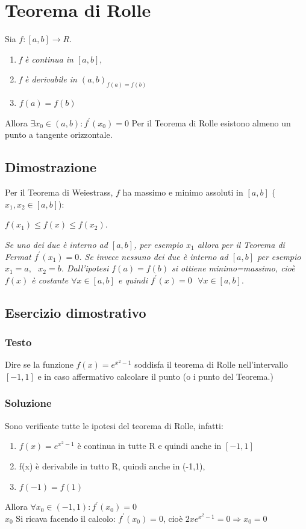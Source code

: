 \section{Teorema di Rolle}
Sia $f:[a,b]\to R$.
\begin{enumerate}
	\item \textit{f è continua in $[a,b]$},
	\item \textit{f è derivabile in $(a,b)_{f(a)=f(b)}$}
	\item $f(a)=f(b)$
\end{enumerate}
Allora $\exists x_0 \in (a,b):f^\prime(x_0)=0$ Per il Teorema di Rolle esistono
almeno un punto a tangente orizzontale.
\subsection{Dimostrazione}
Per il Teorema di Weiestrass, $f$ ha massimo e minimo assoluti in $[a,b]$
($x_1,x_2\in[a,b]$):
\begin{center}
	$f(x_1)\leq f(x)\leq f(x_2).$
\end{center}
\textit{Se uno dei due è interno ad $[a,b]$, per esempio $x_1$ allora per il
Teorema di Fermat $f^\prime(x_1)=0$. Se invece nessuno dei due è interno ad
$[a,b]$ per esempio $x_1=a, \text{ } x_2=b$. Dall'ipotesi $f(a)=f(b)$ si ottiene
minimo=massimo, cioè $f(x)$ è costante $\forall x \in[a,b]$ e quindi
$f^\prime(x)=0\text{ } \forall x \in [a,b]$}.
\subsection{Esercizio dimostrativo}
\subsubsection{Testo}
Dire se la funzione $f(x)=e^{x^2-1}$ soddisfa il teorema di Rolle
nell'intervallo $[-1,1]$ e in caso affermativo calcolare il punto (o i punto
del Teorema.)
\subsubsection{Soluzione}
Sono verificate tutte le ipotesi del teorema di Rolle, infatti:
\begin{enumerate}
	\item $f(x)=e^{x^2-1}$ è continua in tutte R e quindi anche in $[-1,1]$
	\item f(x) è derivabile in tutto R, quindi anche in (-1,1),
	\item $f(-1)=f(1)$
\end{enumerate}
Allora $\forall x_0 \in (-1,1):f^\prime(x_0)=0$\\
$x_0$ Si ricava facendo il calcolo: $f^\prime (x_0)=0$, cioè
$2xe^{x^2-1}=0\Rightarrow x_0=0$
